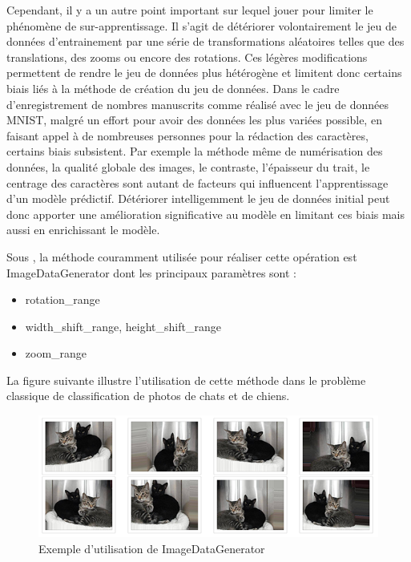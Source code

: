 Cependant, il y a un autre point important sur lequel jouer pour limiter le phénomène de
sur-apprentissage. Il s'agit de détériorer volontairement le jeu de données d'entrainement
par une série de transformations aléatoires telles que des translations, des zooms ou
encore des rotations. Ces légères modifications permettent de rendre le jeu de données 
plus hétérogène et limitent donc certains biais liés à la méthode de création du jeu de
données. Dans le cadre d'enregistrement de nombres manuscrits comme réalisé avec le jeu de 
données MNIST, malgré un effort pour avoir des données les plus variées possible, en faisant
appel à de nombreuses personnes pour la rédaction des caractères, certains biais subsistent.
Par exemple la méthode même de numérisation des données, la qualité globale des images,
le contraste, l'épaisseur du trait, le centrage des caractères sont autant de facteurs qui 
influencent l'apprentissage d'un modèle prédictif. Détériorer intelligemment le jeu de
données initial peut donc apporter une amélioration significative au modèle en limitant 
ces biais mais aussi en enrichissant le modèle. 

Sous \Python {}, la méthode couramment utilisée pour réaliser cette opération
est ImageDataGenerator dont les principaux paramètres sont :

\begin{itemize}
\item rotation_range 
\item width_shift_range, height_shift_range
\item zoom_range
\end{itemize}

La figure suivante illustre l'utilisation
de cette méthode dans le problème classique de classification de photos de chats et de
chiens. 

\begin{figure}[h]
  \centering
  \includegraphics[scale=0.9]{assets/augmented-image}
  \caption{Exemple d'utilisation de ImageDataGenerator}
  \label{fig:augmented-image}
\end{figure}

